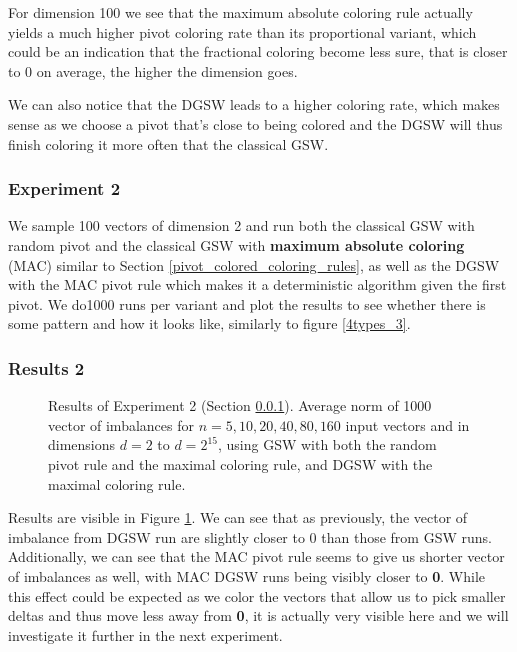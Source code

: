 \documentclass[12pt]{article}
\begin{document}
For dimension 100 we see that the maximum absolute coloring rule actually yields a much higher pivot coloring rate than its proportional variant, which could be an indication that the fractional coloring become less sure, that is closer to 0 on average, the higher the dimension goes.

We can also notice that the DGSW leads to a higher coloring rate, which makes sense as we choose a pivot that's close to being colored and the DGSW will thus finish coloring it more often that the classical GSW.

\subsubsection{Experiment 2}\label{exp_plot_max_col}
We sample 100 vectors of dimension 2 and run both the classical GSW with random pivot and the classical GSW with \textbf{maximum absolute coloring} (MAC) similar to Section \ref{pivot_colored_coloring_rules}, as well as the DGSW with the MAC pivot rule which makes it a deterministic algorithm given the first pivot. We do1000 runs per variant and plot the results to see whether there is some pattern and how it looks like, similarly to figure \ref{4types_3}.

\subsubsection{Results 2}
\begin{figure}[h]
\centering

\caption{Results of Experiment 2 (Section \ref{exp_plot_max_col}). Average norm of 1000 vector of imbalances for $n=5,10,20,40,80,160$ input vectors and in dimensions $d=2$ to $d=2^15$, using GSW with both the random pivot rule and the maximal coloring rule, and DGSW with the maximal coloring rule.}
\label{results_plot_max_col}
\end{figure}
Results are visible in Figure \ref{results_plot_max_col}. We can see that as previously, the vector of imbalance from DGSW run are slightly closer to 0 than those from GSW runs. Additionally, we can see that the MAC pivot rule seems to give us shorter vector of imbalances as well, with MAC DGSW runs being visibly closer to \textbf{0}. While this effect could be expected as we color the vectors that allow us to pick smaller deltas and thus move less away from \textbf{0}, it is actually very visible here and we will investigate it further in the next experiment.
\end{document}
